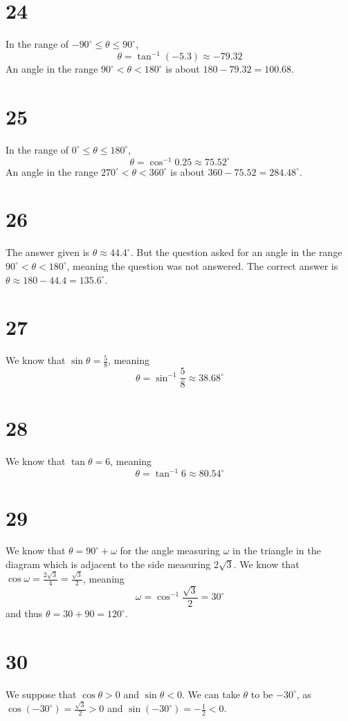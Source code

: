 \documentclass{article}
\theoremstyle{definition}
\newcommand{\?}{\stackrel{?}{=}}
\begin{document}
\section*{24}
In the range of $-90^\circ\le\theta\le 90^\circ$,
\[ \theta=\tan^{-1}(-5.3)\approx -79.32 \] An angle in the range $90^\circ <\theta<180^\circ$ is about
$180-79.32=100.68$.

\section*{25}
In the range of $0^\circ\le\theta\le 180^\circ$,
\[ \theta=\cos^{-1}0.25\approx 75.52^\circ \] An angle in the range $270^\circ<\theta<360^\circ$ is about
$360-75.52=284.48^\circ$.

\section*{26}
The answer given is $\theta\approx 44.4^\circ$. But the question asked for an angle in the range $90^\circ<\theta<180^\circ$, meaning the question was not 
answered. The correct answer is $\theta\approx 180-44.4=135.6^\circ$.

\section*{27}
We know that $\sin\theta=\frac{5}{8}$, meaning
\[ \theta=\sin^{-1}\frac{5}{8}\approx 38.68^\circ \]

\section*{28}
We know that $\tan\theta=6$, meaning
\[ \theta=\tan^{-1}6\approx 80.54^\circ \]

\section*{29}
We know that $\theta=90^\circ+\omega$ for the angle measuring $\omega$ in the triangle in the diagram which is adjacent to the side measuring 
$2\sqrt{3}$. We know that $\cos\omega=\frac{2\sqrt{3}}{4}=\frac{\sqrt{3}}{2}$, meaning
\[ \omega=\cos^{-1}\frac{\sqrt{3}}{2}=30^\circ \] and thus $\theta=30+90=120^\circ$.

\section*{30}
We suppose that $\cos\theta>0$ and $\sin\theta<0$. We can take $\theta$ to be $-30^\circ$, as
$\cos(-30^\circ)=\frac{\sqrt{3}}{2}>0$ and $\sin(-30^\circ)=-\frac{1}{2}<0$.
\end{document}
